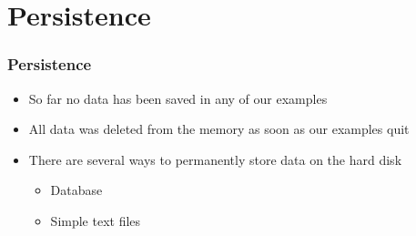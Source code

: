 \documentclass[10pt, a4paper]{beamer} %
\begin{document}

\section{Persistence} %
\label{sec:persistence}

\begin{frame}[c, fragile]\frametitle{Persistence}
\begin{itemize}
    \item So far no data has been saved in any of our examples
    \item All data was deleted from the memory as soon as our examples quit
    \item There are several ways to permanently store data on the hard disk
    \begin{itemize}
        \item Database
        \item Simple text files
    \end{itemize}
\end{itemize}
\end{frame}
\end{document}
